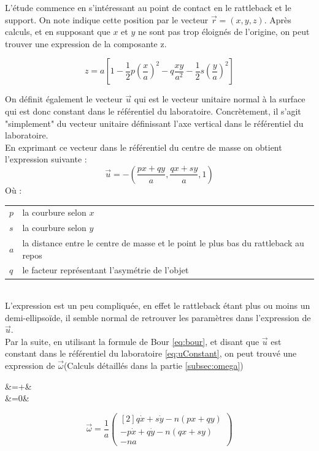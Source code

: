 \documentclass[12pt,a4paper]{article}
\begin{document}
L'étude commence en s'intéressant au point de contact en le rattleback et le support. On note indique cette position par le vecteur $\vec{r}=(x,y,z)$. Après calculs, et en supposant que $x$ et $y$ ne sont pas trop éloignés de l'origine, on peut trouver une expression de la composante z.

\begin{equation}
	z=a\left[ 1-\dfrac {1} {2}p\left( \dfrac {x} {a}\right) ^{2}-q\dfrac {xy} {a^{2}}-\dfrac {1} {2}s\left( \dfrac {y} {a}\right) ^{2}\right]
	\label{eq:z}
\end{equation}

On définit également le vecteur $\vec{u}$ qui est le vecteur unitaire normal à la surface qui est donc constant dans le référentiel du laboratoire. Concrètement, il s'agit "simplement" du vecteur unitaire définissant l'axe vertical dans le référentiel du laboratoire.\\
  
En exprimant ce vecteur dans le référentiel du centre de masse on obtient l'expression suivante :
\begin{equation}
	\vec{u}=-\left(\dfrac{px+qy}{a},\dfrac{qx+sy}{a},1\right)
	\label{eq:uNormal}
\end{equation}
Où : \\
\begin{tabular}{ll}
	$p$ &la courbure selon $x$\\
	$s$ &la courbure selon $y$\\
	$a$ &la distance entre le centre de masse et le point le plus bas du rattleback au repos\\
	$q$	&le facteur représentant l'asymétrie de l'objet
\end{tabular}
\\

L'expression est un peu compliquée, en effet le rattleback étant plus ou moins un demi-ellipsoïde, il semble normal de retrouver les paramètres dans l'expression de $\vec{u}$.\\

Par la suite, en utilisant la formule de Bour \eqref{eq:bour}, et disant que $\vec{u}$ est constant dans le référentiel du laboratoire \eqref{eq:uConstant}, on peut trouvé une expression de $\vec{\omega}$(Calculs détaillés dans la partie \ref{subsec:omega})\\
\begin{multicols}{2}
	\setlength\columnseprule{0.5pt}
	\noindent
	\begin{flalign}
	&=+\vec{\omega}\times{}&
	\label{eq:bour}\\[1em]
	&=0&
	\label{eq:uConstant}
	\end{flalign}
	\vfill\null
	\columnbreak
	\noindent
	\begin{equation}
	\vec{\omega}=\dfrac{1}{a}\begin{pmatrix}[2]
	q\dot{x}+s\dot{y}-n(px+qy)\\
	-p\dot{x}+q\dot{y}-n(qx+sy)\\
	- na
	\end{pmatrix}
	\end{equation}
\end{multicols}
\end{document}
